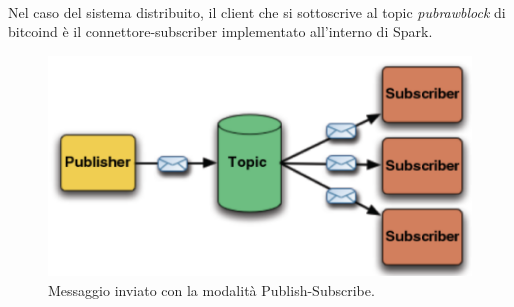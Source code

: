 \\Nel caso del sistema distribuito, il client che si sottoscrive al topic \textit{pubrawblock} di bitcoind è il connettore-subscriber implementato all'interno di Spark. 
\begin{figure}[H]
	\centering
	\includegraphics[width=\textwidth]{images/sub_pub.png}
	\caption{Messaggio inviato con la modalità Publish-Subscribe.}
	\label{fig:PubSubTopic}
\end{figure}